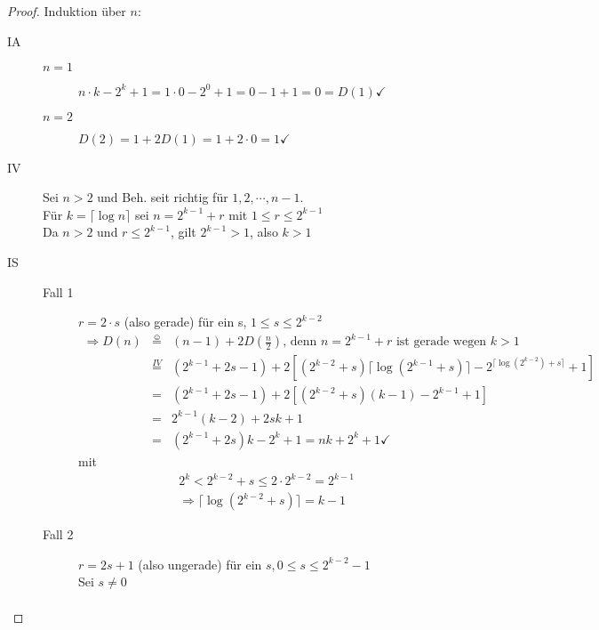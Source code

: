 \documentclass[a4paper,10pt]{scrartcl}
\begin{document}
\begin{proof}
 Induktion über $n$:
 \begin{description}
  \item[IA] \begin{description}
             \item[$n=1$] $n\cdot k-2^k+1=1\cdot0-2^0+1=0-1+1=0=D(1)\checkmark$
             \item[$n=2$] $D(2)=1+2D(1)=1+2\cdot0=1\checkmark$ 
            \end{description}
  \item[IV] Sei $n>2$ und Beh. seit richtig für $1,2,\cdots,n-1$.\\
            Für $k=\lceil\log n\rceil$ sei $n=2^{k-1}+r$ mit $1\leq r\leq2^{k-1}$\\
            Da $n>2$ und $r\leq2^{k-1}$, gilt $2^{k-1}>1$, also $k>1$
  \item[IS] \begin{description}
             \item[Fall 1] $r=2\cdot s$ (also gerade) für ein s, $1\leq s\leq2^{k-2}$
                            \begin{eqnarray*}
                             \Rightarrow D(n)&\stackrel{\smiley}{=}&(n-1)+2D\left(\frac{n}{2}\right)\text{, denn } n=2^{k-1}+r
			      \text{ ist gerade wegen }k>1\\
                             &\stackrel{IV}{=}&(2^{k-1}+2s-1)+2[(2^{k-2}+s)\lceil\log(2^{k-1}+s)\rceil-2^{\lceil\log(2^{k-2})+s\rceil}+1]\\
                             &=&(2^{k-1}+2s-1)+2[(2^{k-2}+s)(k-1)-2^{k-1}+1]\\
                             &=&2^{k-1}(k-2)+2sk+1\\
                             &=&(2^{k-1}+2s)k-2^k+1=nk+2^k+1\checkmark
                            \end{eqnarray*}
                            mit
                            \begin{eqnarray*}
                             2^k<2^{k-2}+s\leq2\cdot2^{k-2}=2^{k-1}\\
                             \Rightarrow\lceil\log(2^{k-2}+s)\rceil=k-1
                            \end{eqnarray*}
             \item[Fall 2] $r=2s+1$ (also ungerade) für ein $s, 0\leq s\leq2^{k-2}-1$\\Sei $s\neq0$
                           \begin{eqnarray*}

\end{eqnarray*}
\end{description}
\end{description}
\end{proof}
\end{document}
